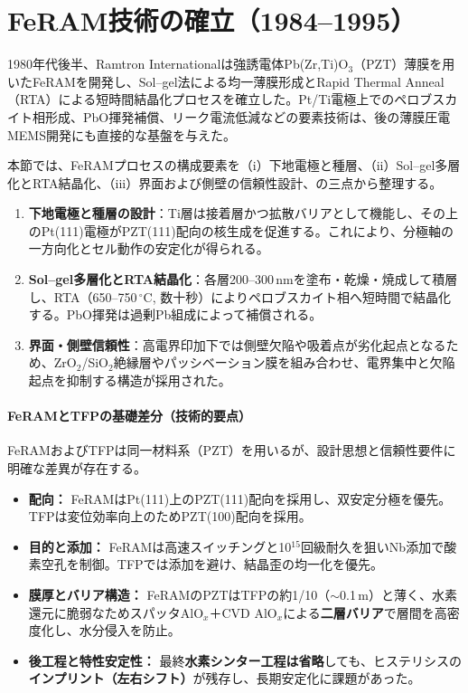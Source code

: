 \documentclass[conference]{IEEEtran}
\begin{document}
\section{FeRAM技術の確立（1984--1995）}
1980年代後半、Ramtron Internationalは強誘電体Pb(Zr,Ti)O$_3$（PZT）薄膜を用いたFeRAMを開発し、Sol--gel法による均一薄膜形成とRapid Thermal Anneal（RTA）による短時間結晶化プロセスを確立した\cite{ramtron_iedm1989,bottaro1993solgel}。Pt/Ti電極上でのペロブスカイト相形成、PbO揮発補償、リーク電流低減などの要素技術は、後の薄膜圧電MEMS開発にも直接的な基盤を与えた\cite{scott2000review}。

本節では、FeRAMプロセスの構成要素を（i）下地電極と種層、（ii）Sol--gel多層化とRTA結晶化、（iii）界面および側壁の信頼性設計、の三点から整理する。

\begin{enumerate}
  \item \textbf{下地電極と種層の設計}：Ti層は接着層かつ拡散バリアとして機能し、その上のPt(111)電極がPZT(111)配向の核生成を促進する。これにより、分極軸の一方向化とセル動作の安定化が得られる。
  \item \textbf{Sol--gel多層化とRTA結晶化}：各層200--300\,nmを塗布・乾燥・焼成して積層し、RTA（650--750\,$^\circ$C, 数十秒）によりペロブスカイト相へ短時間で結晶化する。PbO揮発は過剰Pb組成によって補償される。
  \item \textbf{界面・側壁信頼性}：高電界印加下では側壁欠陥や吸着点が劣化起点となるため、ZrO$_2$/SiO$_2$絶縁層やパッシベーション膜を組み合わせ、電界集中と欠陥起点を抑制する構造が採用された。
\end{enumerate}

\paragraph{FeRAMとTFPの基礎差分（技術的要点）}
FeRAMおよびTFPは同一材料系（PZT）を用いるが、設計思想と信頼性要件に明確な差異が存在する。
\begin{itemize}
  \item \textbf{配向：} FeRAMはPt(111)上のPZT(111)配向を採用し、双安定分極を優先。TFPは変位効率向上のためPZT(100)配向を採用。
  \item \textbf{目的と添加：} FeRAMは高速スイッチングと10$^{15}$回級耐久を狙いNb添加で酸素空孔を制御。TFPでは添加を避け、結晶歪の均一化を優先。
  \item \textbf{膜厚とバリア構造：} FeRAMのPZTはTFPの約1/10（$\sim$0.1\,\textmu m）と薄く、水素還元に脆弱なためスパッタAlO$_x$＋CVD AlO$_x$による\textbf{二層バリア}で層間を高密度化し、水分侵入を防止。
  \item \textbf{後工程と特性安定性：} 最終\textbf{水素シンター工程は省略}しても、ヒステリシスの\textbf{インプリント（左右シフト）}が残存し、長期安定化に課題があった。
\end{itemize}
\end{document}
